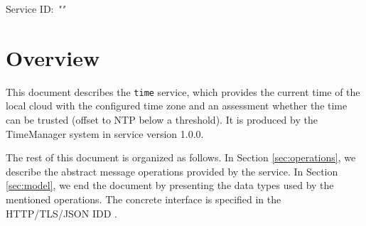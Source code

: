 \documentclass[a4paper]{arrowhead}
\begin{document}
\sloppy

\ArrowheadSetup

\begin{center}
  \vspace*{1cm}
  \huge{\arrowtitle}

  \vspace*{0.2cm}
  \LARGE{\arrowtype}
  \vspace*{1cm}

  \Large{Service ID: \textit{"\arrowid"}}

  \vspace*{\fill}


  \vspace*{1cm}
  \vspace*{\fill}

  \begin{abstract}
    This document describes the \texttt{time} service, version 1.0.0, produced by the TimeManager support system of Arrowhead 5.2.2.
  \end{abstract}

  \vspace*{1cm}
\end{center}

\newpage

\tableofcontents
\newpage

\section{Overview}
\label{sec:overview}

This document describes the \texttt{time} service, which provides the current time of the local cloud with the configured time zone and an assessment whether the time can be trusted (offset to NTP below a threshold).
It is produced by the TimeManager system \cite{tim-sysd} in service version 1.0.0.

The rest of this document is organized as follows.
In Section \ref{sec:operations}, we describe the abstract message operations provided by the service.
In Section \ref{sec:model}, we end the document by presenting the data types used by the mentioned operations.
The concrete interface is specified in the HTTP/TLS/JSON IDD \cite{tim-time-http-idd}.
\end{document}
